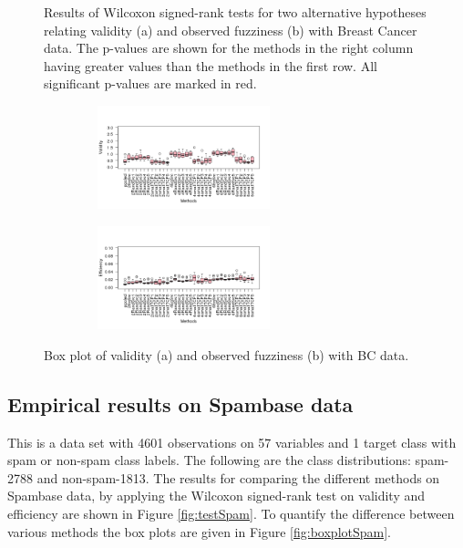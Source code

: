 \documentclass[main]{subfiles}
\begin{document}
\begin{figure}[h]
\begin{subfigure}{.5\textwidth}
\end{subfigure}%
\caption{\small Results of Wilcoxon signed-rank tests for two alternative hypotheses relating validity (a) and observed fuzziness (b) with Breast Cancer data. The p-values are shown for the methods in the right column having greater values than the methods in the first row. All significant p-values are marked in red. } \label{fig:testBC}
\end{figure}
\begin{figure}[h]
\centering
\begin{subfigure}{.5\textwidth}
  \centering
  \includegraphics[width=6cm,height=3cm]{images/boxplotBC}
\end{subfigure}%
\begin{subfigure}{.5\textwidth}
  \centering
  \includegraphics[width=6cm,height=3cm]{images/boxplotBC_eff}
\end{subfigure}%
\caption{\small Box plot of validity (a) and observed fuzziness (b) with BC data.} \label{fig:boxplotBC}
\end{figure}

\subsection{Empirical results on Spambase data}
This is a data set with 4601 observations on 57 variables and 1 target class with spam or non-spam class labels. The following are the class distributions: spam-2788 and non-spam-1813.
The results for comparing the different methods on Spambase data, by applying the Wilcoxon signed-rank test on validity and efficiency are shown in Figure \ref{fig:testSpam}. To quantify the difference between various methods the box plots are given in Figure \ref{fig:boxplotSpam}.
\end{document}
